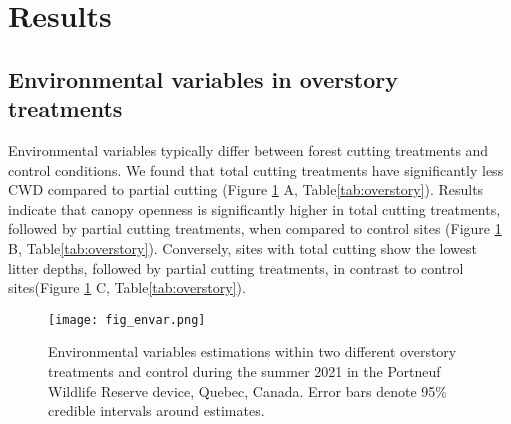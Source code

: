\clearpage



\section*{Results}
\label{sec:results1}

\subsection*{Environmental variables in overstory treatments}
\label{subsec:ResEnv}

Environmental variables typically differ between forest cutting treatments and control conditions. We found that total cutting treatments have significantly less CWD compared to partial cutting (Figure \ref{fig:envar} A, Table\ref{tab:overstory}). Results indicate that canopy openness is significantly higher in total cutting treatments, followed by partial cutting treatments, when compared to control sites (Figure \ref{fig:envar} B, Table\ref{tab:overstory}). Conversely, sites with total cutting show the lowest litter depths, followed by partial cutting treatments, in contrast to control sites(Figure \ref{fig:envar} C, Table\ref{tab:overstory}).

\begin{figure}[ht!]
  \centering
  \texttt{[image: fig\_envar.png]}
  \caption[Overstory treatments effects on environmental variables]{ Environmental variables estimations within two different overstory treatments and control during the summer 2021 in the Portneuf Wildlife Reserve device, Quebec, Canada. 
  Error bars denote 95\% credible intervals around estimates.}
  \label{fig:envar}
\end{figure}


